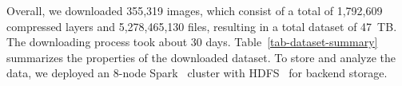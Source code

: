 %
%

Overall, we downloaded 355,319 images, which consist of a total of 1,792,609
compressed layers and 5,278,465,130 files, resulting in a total dataset
of 47~TB.
%
The downloading process took about 30 days.
%
Table~\ref{tab-dataset-summary} summarizes the properties of the downloaded
dataset.
%
%
%
To store and analyze the data, we deployed an 8-node Spark~
cluster with HDFS~ for backend storage.
